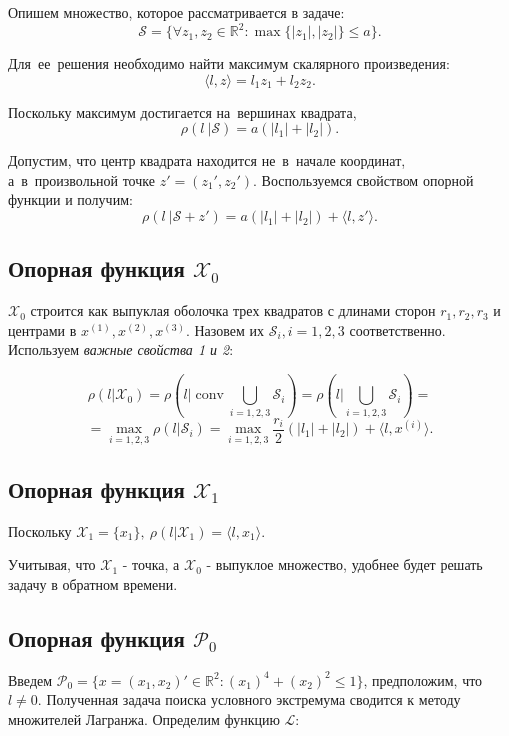 \documentclass{article}
\theoremstyle{definition}
\newcommand{\conv}{\mathop{\mathrm{conv}}}
\begin{document}
Опишем множество, которое рассматривается в задаче:
$$\mathcal{S} = \{ \forall z_1, z_2 \in \mathbb{R}^2: \max\{|z_1|, |z_2|\} \leqslant a \}.$$

Для~ее~решения необходимо найти максимум скалярного произведения:
$$\langle \textit{l} , z \rangle = l_1z_1+l_2z_2.$$

Поскольку максимум достигается на~вершинах квадрата,
$$\rho(\textit{l}~|\mathcal{S}) = a(|l_1|+|l_2|).$$

Допустим, что центр квадрата находится не~в~начале координат, а~в~произвольной точке 
$z' = (z_1',z_2')$. Воспользуемся свойством опорной функции и получим:
$$\rho(\textit{l}~|\mathcal{S}+z') = a(|l_1|+|l_2|)
+ \langle \textit{l} , z' \rangle.$$

\subsection{Опорная функция $\mathcal{X}_0$}

$\mathcal{X}_0$ строится как выпуклая оболочка трех квадратов с длинами сторон $r_1, r_2, r_3$ и
центрами в $x^{(1)}, x^{(2)}, x^{(3)}$. Назовем их $\mathcal{S}_i, i = 1,2,3$ соответственно.
Используем \textit{важные свойства 1 и 2}:

$$\rho(l|\mathcal{X}_0) = \rho(l|\conv \bigcup\limits_{i = 1,2,3} \mathcal{S}_i) = 
\rho(l|\bigcup\limits_{i = 1,2,3} \mathcal{S}_i)=$$ $$= \max_{i = 1,2,3} \rho(l|\mathcal{S}_i) = 
\max_{i = 1,2,3} \frac{r_i}{2}(|l_1|+|l_2|) + \langle l , x^{(i)} \rangle.$$

\subsection{Опорная функция $\mathcal{X}_1$}

Поскольку $\mathcal{X}_1 = \{x_1\},~ \rho(l|\mathcal{X}_1) = \langle l, x_1 \rangle.$

Учитывая, что $\mathcal{X}_1$ - точка, а $\mathcal{X}_0$ - выпуклое множество,
удобнее будет решать задачу в обратном времени.
\newpage

\subsection{Опорная функция $\mathcal{P}_0$}

Введем $\mathcal{P}_0 = \{x = (x_1,x_2)' \in \mathbb{R}^2: (x_1)^4+(x_2)^2 \leqslant 1\}$,
предположим, что $l \neq 0$. Полученная задача поиска условного экстремума сводится к 
методу множителей Лагранжа. Определим функцию $\mathcal{L}$:
\end{document}
